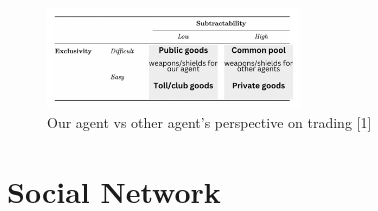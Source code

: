 \begin{figure}[htb]
    \centering
    \includegraphics[width=0.60\textwidth]{008_team_5_agent_design/images/13.png}
    \caption{Our agent vs other agent's perspective on trading [1]}
    \label{13}
\end{figure}


\section{Social Network}

